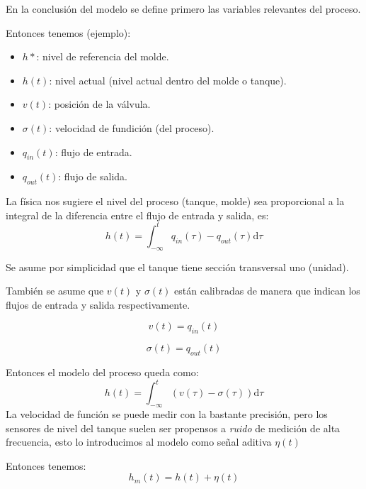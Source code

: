 \documentclass[a4paper]{article}
\begin{document}
En la conclusión del modelo se define primero las variables relevantes del proceso.

Entonces tenemos (ejemplo):
\begin{itemize}
\item $h*$: nivel de referencia del molde.
\item $h(t)$: nivel actual (nivel actual dentro del molde o tanque).
\item $v(t)$: posición de la válvula.
\item $\sigma(t)$: velocidad de fundición (del proceso).
\item $q_{in}(t)$: flujo de entrada.
\item $q_{out}(t)$: flujo de salida.
\end{itemize}

La física nos sugiere el nivel del proceso (tanque, molde) sea proporcional a la integral de la diferencia entre el flujo de entrada y salida, es:
\begin{equation}\label{eq:altura}
		h(t) = \int_{-\infty}^{t}q_{in} (\tau) - q_{out} (\tau) \mathrm{d}\tau
\end{equation}

Se asume por simplicidad que el tanque tiene sección transversal uno (unidad).

También se asume que $v(t)$ y $\sigma(t)$ están calibradas de manera que indican los flujos de entrada y salida respectivamente.

\begin{equation}\label{eq:valvula}
		v(t) = q_{in} (t)
\end{equation}

\begin{equation}\label{eq:velocidad}
		\sigma (t) = q_{out} (t)
\end{equation}

Entonces el modelo del proceso queda como:
\begin{equation}\label{eq:altura2}
		h(t) = \int_{-\infty}^{t}(v(\tau) - \sigma(\tau)) \mathrm{d}\tau
\end{equation}
La velocidad de función se puede medir con la bastante precisión, pero los sensores de nivel del tanque suelen ser propensos a \emph{ruido} de medición de alta frecuencia, esto lo introducimos al modelo como señal aditiva $\eta(t)$

Entonces tenemos:
\begin{equation}\label{eq:ruido}
h_{m} (t) = h(t) + \eta(t)
\end{equation}
\end{document}
